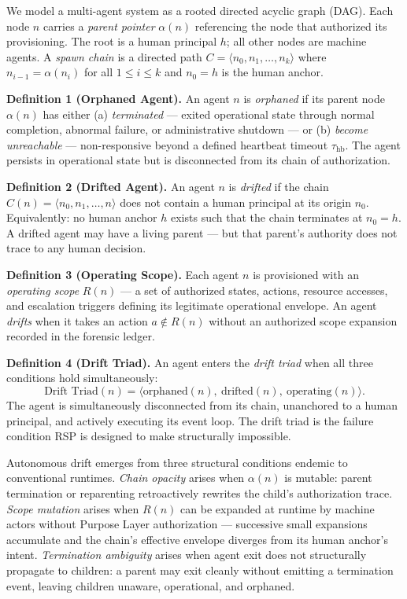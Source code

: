 We model a multi-agent system as a rooted directed acyclic graph (DAG). Each node $n$ carries a \emph{parent pointer} $\alpha(n)$ referencing the node that authorized its provisioning. The root is a human principal $h$; all other nodes are machine agents. A \emph{spawn chain} is a directed path $C = \langle n_0, n_1, \ldots, n_k \rangle$ where $n_{i-1} = \alpha(n_i)$ for all $1 \leq i \leq k$ and $n_0 = h$ is the human anchor.

\medskip
\noindent\textbf{Definition 1 (Orphaned Agent).} An agent $n$ is \emph{orphaned} if its parent node $\alpha(n)$ has either (a) \emph{terminated} — exited operational state through normal completion, abnormal failure, or administrative shutdown — or (b) \emph{become unreachable} — non-responsive beyond a defined heartbeat timeout $\tau_{\mathrm{hb}}$. The agent persists in operational state but is disconnected from its chain of authorization.

\medskip
\noindent\textbf{Definition 2 (Drifted Agent).} An agent $n$ is \emph{drifted} if the chain $C(n) = \langle n_0, n_1, \ldots, n \rangle$ does not contain a human principal at its origin $n_0$. Equivalently: no human anchor $h$ exists such that the chain terminates at $n_0 = h$. A drifted agent may have a living parent — but that parent's authority does not trace to any human decision.

\medskip
\noindent\textbf{Definition 3 (Operating Scope).} Each agent $n$ is provisioned with an \emph{operating scope} $R(n)$ — a set of authorized states, actions, resource accesses, and escalation triggers defining its legitimate operational envelope. An agent \emph{drifts} when it takes an action $a \notin R(n)$ without an authorized scope expansion recorded in the forensic ledger.

\medskip
\noindent\textbf{Definition 4 (Drift Triad).} An agent enters the \emph{drift triad} when all three conditions hold simultaneously:
\begin{equation}
\text{Drift Triad}(n) = \bigl\langle \text{orphaned}(n),\ \text{drifted}(n),\ \text{operating}(n) \bigr\rangle .
\label{eq:intro-drift-triad}
\end{equation}
The agent is simultaneously disconnected from its chain, unanchored to a human principal, and actively executing its event loop. The drift triad is the failure condition RSP is designed to make structurally impossible.

Autonomous drift emerges from three structural conditions endemic to conventional runtimes. \emph{Chain opacity} arises when $\alpha(n)$ is mutable: parent termination or reparenting retroactively rewrites the child's authorization trace. \emph{Scope mutation} arises when $R(n)$ can be expanded at runtime by machine actors without Purpose Layer authorization — successive small expansions accumulate and the chain's effective envelope diverges from its human anchor's intent. \emph{Termination ambiguity} arises when agent exit does not structurally propagate to children: a parent may exit cleanly without emitting a termination event, leaving children unaware, operational, and orphaned.

